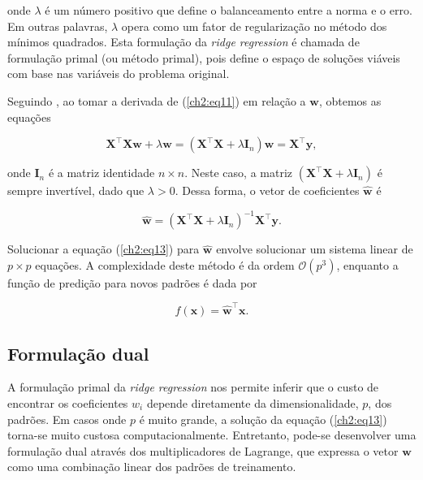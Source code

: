 \noindent onde $\lambda$ é um número positivo que define o balanceamento entre a norma e o erro. Em outras palavras, $\lambda$ opera como um fator de regularização no método dos mínimos quadrados. Esta formulação da \textit{ridge regression} é chamada de formulação primal (ou método primal), pois define o espaço de soluções viáveis com base nas variáveis do problema original.

Seguindo , ao tomar a derivada de (\ref{ch2:eq11}) em relação a $\mathbf{w}$, obtemos as equações

\begin{equation}
    \label{ch2:eq12}
    \mathbf{X}^{\top}\mathbf{X}\mathbf{w} + \lambda\mathbf{w} = (\mathbf{X}^{\top}\mathbf{X} + \lambda\mathbf{I}_n)\mathbf{w} = \mathbf{X}^{\top}\mathbf{y},
\end{equation}

\noindent onde $\mathbf{I}_n$ é a matriz identidade $n \times n$. Neste caso, a matriz $(\mathbf{X}^{\top}\mathbf{X} + \lambda\mathbf{I}_n)$ é sempre invertível, dado que $\lambda > 0$. Dessa forma, o vetor de coeficientes $\mathbf{\hat{w}}$ é

\begin{equation}
    \label{ch2:eq13}
    \mathbf{\hat{w}} = (\mathbf{X}^{\top}\mathbf{X} + \lambda\mathbf{I}_n)^{-1}\mathbf{X}^{\top}\mathbf{y}.
\end{equation}

Solucionar a equação (\ref{ch2:eq13}) para $\mathbf{\hat{w}}$ envolve solucionar um sistema linear de $p \times p$ equações. A complexidade deste método é da ordem $\mathcal{O}(p^3)$, enquanto a função de predição para novos padrões é dada por

\begin{equation}
    \label{ch2:eq14}
    f(\mathbf{x}) = \mathbf{\hat{w}}^{\top}\mathbf{x}.
\end{equation}

\subsection{Formulação dual} \label{subsec:ridge-dual}
A formulação primal da \textit{ridge regression} nos permite inferir que o custo de encontrar os coeficientes $w_i$ depende diretamente da dimensionalidade, $p$, dos padrões. Em casos onde $p$ é muito grande, a solução da equação (\ref{ch2:eq13}) torna-se muito custosa computacionalmente. Entretanto, pode-se desenvolver uma formulação dual através dos multiplicadores de Lagrange, que expressa o vetor $\mathbf{w}$ como uma combinação linear dos padrões de treinamento.

